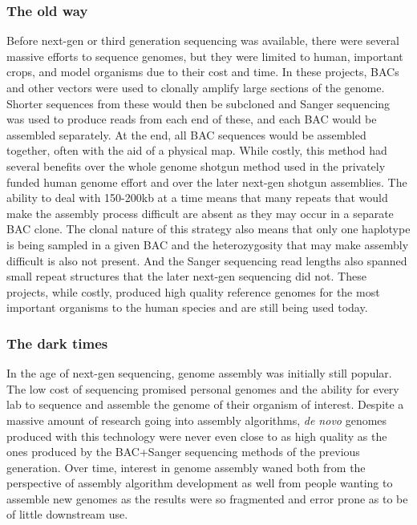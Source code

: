 \subsubsection{The old way}

\par{
Before next-gen or third generation sequencing was available, there were several massive efforts to sequence genomes, but they were limited to human, important crops, and model organisms due to their cost and time\cite{genomeproject}\cite{mousegenome}\cite{maizegenome}. In these projects, BACs and other vectors were used to clonally amplify large sections of the genome. Shorter sequences from these would then be subcloned and Sanger sequencing was used to produce reads from each end of these, and each BAC would be assembled separately. At the end, all BAC sequences would be assembled together, often with the aid of a physical map. While costly, this method had several benefits over the whole genome shotgun method used in the privately funded human genome effort and over the later next-gen shotgun assemblies. The ability to deal with 150-200kb at a time means that many repeats that would make the assembly process difficult are absent as they may occur in a separate BAC clone. The clonal nature of this strategy also means that only one haplotype is being sampled in a given BAC and the heterozygosity that may make assembly difficult is also not present. And the Sanger sequencing read lengths also spanned small repeat structures that the later next-gen sequencing did not. These projects, while costly, produced high quality reference genomes for the most important organisms to the human species and are still being used today.
}

\subsubsection{The dark times}

\par{
In the age of next-gen sequencing, genome assembly was initially still popular. The low cost of sequencing promised personal genomes and the ability for every lab to sequence and assemble the genome of their organism of interest. Despite a massive amount of research going into assembly algorithms, \textit{de novo} genomes produced with this technology were never even close to as high quality as the ones produced by the BAC+Sanger sequencing methods of the previous generation\cite{illuminashit}\cite{gage}. Over time, interest in genome assembly waned both from the perspective of assembly algorithm development as well from people wanting to assemble new genomes as the results were so fragmented and error prone as to be of little downstream use\cite{assemblethon}.
}

